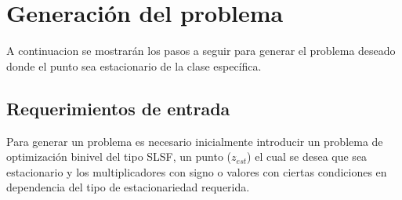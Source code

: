 \section{Generación del problema}
A continuacion se mostrarán los pasos a seguir para generar el problema deseado donde el punto sea estacionario de la clase específica.
\subsection{Requerimientos de entrada}

Para generar un problema es necesario inicialmente introducir un problema de optimización binivel del tipo SLSF, un punto ($z_{est}$) el cual
se desea que sea estacionario y los multiplicadores con signo o valores con ciertas condiciones en dependencia del tipo de estacionariedad requerida.

